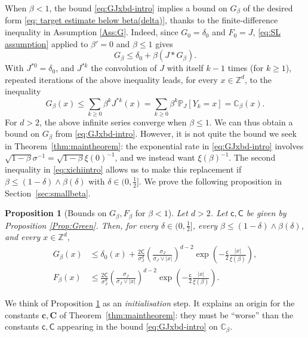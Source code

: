 \documentclass[11pt,a4paper]{article}
\numberwithin{equation}{section}
\theoremstyle{plain}
\newtheorem{Prop}[Thm]{Proposition}
\theoremstyle{definition}
\newcommand\1{\mathds{1}}
\newcommand\bfc{\mathbf{c}}
\newcommand\bfC{\mathbf{C}}
\newcommand\CGreen{\mathsf{C}}
\newcommand\cGreen{\mathsf{c}}
\begin{document}
\vspace{3pt}
When $\beta <1$, the bound \eqref{eq:GJxbd-intro} implies a bound on $G_\beta$
of the desired form \eqref{eq: target estimate below beta(delta)}, thanks to the finite-difference inequality in Assumption \ref{Ass:G}. Indeed, since $G_0=\delta_0$ and $F_0=J$, \eqref{eq:SL assumption} applied to $\beta'=0$ and $\beta\leq 1$ gives
\begin{equation}
	G_\beta\leq \delta_0+\beta(J*G_\beta).
\end{equation}
With $J^{*0}=\delta_0$, and $J^{*k}$ the convolution of $J$ with itself $k-1$ times
(for $k\geq 1$),
repeated iterations of the above inequality leads, for every $x\in \mathbb Z^d$, to the inequality
\begin{equation}\label{eq:GAb-bis}
	G_\beta(x)\leq \sum_{k\geq 0}\beta^kJ^{*k}(x)
    =
    \sum_{k\geq 0}\beta^k\mathbb P_J [Y_k=x] =
    \mathbb C_\beta(x).
\end{equation}
For $d>2$, the above infinite series converge when $\beta\leq 1$. We can thus obtain a bound on $G_\beta$ from \eqref{eq:GJxbd-intro}.  However, it is not quite the bound we seek in Theorem~\ref{thm:maintheorem}: the exponential rate in \eqref{eq:GJxbd-intro} involves $\sqrt{1-\beta}\sigma^{-1}=\sqrt{1-\beta}\xi(0)^{-1}$, and we instead want $\xi(\beta)^{-1}$.
The second inequality in \eqref{eq:xichiintro} allows us to make this replacement if $\beta\leq (1-\delta)\wedge \beta(\delta)$ with $\delta\in (0,\tfrac{1}{2}]$.  We prove the following proposition
in Section~\ref{sec:smallbeta}.

\begin{Prop}[Bounds on $G_\beta,F_\beta$ for $\beta<1$]
\label{prop:explicit bound on G for small beta}
Let $d>2$. Let $\cGreen,\CGreen$ be given by Proposition \textup{\ref{Prop:Green}}.
Then, for every $\delta\in (0,\tfrac{1}{2}]$, every $\beta\leq (1-\delta)\wedge \beta(\delta)$, and every $x\in \mathbb Z^d$,
\begin{align}
\label{eq:Gxbd}
	G_\beta(x)&\leq \delta_0(x)+\frac{2\CGreen}{\sigma_J^d}\left(\frac{\sigma_J}{\sigma_J\vee |x|}\right)^{d-2}\exp\left(-\frac{\cGreen}{2}\frac{|x|}{\xi(\beta)}\right),
	\\
\label{eq:Fxbd}
	F_\beta(x)&\leq \frac{2\CGreen}{\sigma_J^d}\left(\frac{\sigma_J}{\sigma_J\vee |x|}\right)^{d-2}\exp\left(-\frac{\cGreen}{2}\frac{|x|}{\xi(\beta)}\right).
\end{align}
\end{Prop}

We  think of Proposition \ref{prop:explicit bound on G for small beta} as an \emph{initialisation} step.
It explains an origin for the constants $\bfc,\bfC$ of Theorem~\ref{thm:maintheorem}: they must be ``worse'' than the constants
$\cGreen,\CGreen$ appearing in the bound \eqref{eq:GJxbd-intro} on $\mathbb C_\beta$.
\end{document}
